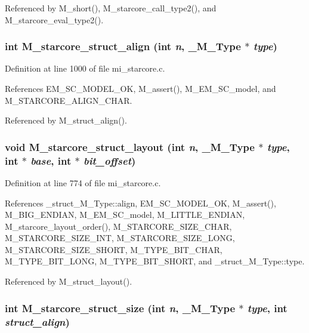 Referenced by M\_\-short(), M\_\-starcore\_\-call\_\-type2(), and M\_\-starcore\_\-eval\_\-type2().
\subsubsection{\setlength{\rightskip}{0pt plus 5cm}int M\_\-starcore\_\-struct\_\-align (int {\em n}, \bf{\_\-M\_\-Type} $\ast$ {\em type})}\label{m__starcore_8h_415d3b3506c6260bbc115242a3de7f22}




Definition at line 1000 of file mi\_\-starcore.c.

References EM\_\-SC\_\-MODEL\_\-OK, M\_\-assert(), M\_\-EM\_\-SC\_\-model, and M\_\-STARCORE\_\-ALIGN\_\-CHAR.

Referenced by M\_\-struct\_\-align().
\subsubsection{\setlength{\rightskip}{0pt plus 5cm}void M\_\-starcore\_\-struct\_\-layout (int {\em n}, \bf{\_\-M\_\-Type} $\ast$ {\em type}, int $\ast$ {\em base}, int $\ast$ {\em bit\_\-offset})}\label{m__starcore_8h_680fe22170314eada21447c284d1f7a1}




Definition at line 774 of file mi\_\-starcore.c.

References \_\-struct\_\-M\_\-Type::align, EM\_\-SC\_\-MODEL\_\-OK, M\_\-assert(), M\_\-BIG\_\-ENDIAN, M\_\-EM\_\-SC\_\-model, M\_\-LITTLE\_\-ENDIAN, M\_\-starcore\_\-layout\_\-order(), M\_\-STARCORE\_\-SIZE\_\-CHAR, M\_\-STARCORE\_\-SIZE\_\-INT, M\_\-STARCORE\_\-SIZE\_\-LONG, M\_\-STARCORE\_\-SIZE\_\-SHORT, M\_\-TYPE\_\-BIT\_\-CHAR, M\_\-TYPE\_\-BIT\_\-LONG, M\_\-TYPE\_\-BIT\_\-SHORT, and \_\-struct\_\-M\_\-Type::type.

Referenced by M\_\-struct\_\-layout().
\subsubsection{\setlength{\rightskip}{0pt plus 5cm}int M\_\-starcore\_\-struct\_\-size (int {\em n}, \bf{\_\-M\_\-Type} $\ast$ {\em type}, int {\em struct\_\-align})}\label{m__starcore_8h_25b8e6274747db080cc9fbf1b82d3a25}




